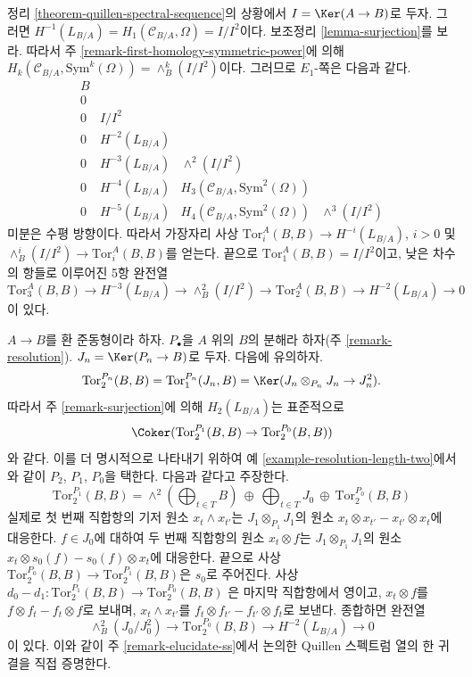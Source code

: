 \begin{remark}
\label{remark-elucidate-ss}
정리 \ref{theorem-quillen-spectral-sequence}의 상황에서
$I = \Ker(A \to B)$로 두자. 그러면
$H^{-1}(L_{B/A}) = H_1(\mathcal{C}_{B/A}, \Omega) = I/I^2$이다. 보조정리
\ref{lemma-surjection}를 보라. 따라서 주
\ref{remark-first-homology-symmetric-power}에 의해
$H_k(\mathcal{C}_{B/A}, \text{Sym}^k(\Omega)) = \wedge^k_B(I/I^2)$이다.
그러므로 $E_1$-쪽은 다음과 같다.
$$
\begin{matrix}
B \\
0 \\
0 & I/I^2 \\
0 & H^{-2}(L_{B/A}) \\
0 & H^{-3}(L_{B/A}) & \wedge^2(I/I^2) \\
0 & H^{-4}(L_{B/A}) & H_3(\mathcal{C}_{B/A}, \text{Sym}^2(\Omega)) \\
0 & H^{-5}(L_{B/A}) & H_4(\mathcal{C}_{B/A}, \text{Sym}^2(\Omega)) &
\wedge^3(I/I^2)
\end{matrix}
$$
미분은 수평 방향이다. 따라서 가장자리 사상
$\text{Tor}_i^A(B, B) \to H^{-i}(L_{B/A})$, $i > 0$ 및
$\wedge^i_B(I/I^2) \to \text{Tor}_i^A(B, B)$를 얻는다. 끝으로
$\text{Tor}_1^A(B, B) = I/I^2$이고, 낮은 차수의 항들로 이루어진 5항
완전열
$$
\text{Tor}_3^A(B, B) \to H^{-3}(L_{B/A}) \to \wedge^2_B(I/I^2) \to
\text{Tor}_2^A(B, B) \to H^{-2}(L_{B/A}) \to 0
$$
이 있다.
\end{remark}

\begin{remark}
\label{remark-elucidate-degree-two}
$A \to B$를 환 준동형이라 하자. $P_\bullet$을 $A$ 위의 $B$의 분해라
하자(주 \ref{remark-resolution}). $J_n = \Ker(P_n \to B)$로 두자. 다음에
유의하자.
$$
\text{Tor}_2^{P_n}(B, B) = 
\text{Tor}_1^{P_n}(J_n, B) =
\Ker(J_n \otimes_{P_n} J_n \to J_n^2).
$$
따라서 주 \ref{remark-surjection}에 의해 $H_2(L_{B/A})$는 표준적으로
$$
\Coker(\text{Tor}_2^{P_1}(B, B) \to \text{Tor}_2^{P_0}(B, B))
$$
와 같다. 이를 더 명시적으로 나타내기 위하여 예
\ref{example-resolution-length-two}에서와 같이 $P_2$, $P_1$, $P_0$을
택한다. 다음과 같다고 주장한다.
$$
\text{Tor}_2^{P_1}(B, B) =
\wedge^2(\bigoplus\nolimits_{t \in T} B)\ \oplus
\ \bigoplus\nolimits_{t \in T} J_0\ \oplus
\ \text{Tor}_2^{P_0}(B, B)
$$
실제로 첫 번째 직합항의 기저 원소 $x_t \wedge x_{t'}$는
$J_1 \otimes_{P_1} J_1$의 원소
$x_t \otimes x_{t'} - x_{t'} \otimes x_t$에 대응한다. $f \in J_0$에
대하여 두 번째 직합항의 원소 $x_t \otimes f$는
$J_1 \otimes_{P_1} J_1$의 원소
$x_t \otimes s_0(f) - s_0(f) \otimes x_t$에 대응한다. 끝으로 사상
$\text{Tor}_2^{P_0}(B, B) \to \text{Tor}_2^{P_1}(B, B)$은 $s_0$로
주어진다. 사상
$d_0 - d_1 : \text{Tor}_2^{P_1}(B, B) \to \text{Tor}_2^{P_0}(B, B)$
은 마지막 직합항에서 영이고, $x_t \otimes f$를
$f \otimes f_t - f_t \otimes f$로 보내며, $x_t \wedge x_{t'}$를
$f_t \otimes f_{t'} - f_{t'} \otimes f_t$로 보낸다. 종합하면 완전열
$$
\wedge^2_B(J_0/J_0^2) \to \text{Tor}_2^{P_0}(B, B) \to H^{-2}(L_{B/A}) \to 0
$$
이 있다. 이와 같이 주 \ref{remark-elucidate-ss}에서 논의한 Quillen
스펙트럼 열의 한 귀결을 직접 증명한다.
\end{remark}






